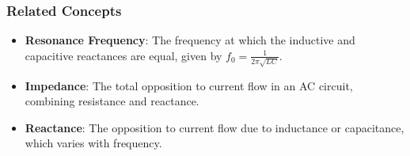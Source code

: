 \subsubsection{Related Concepts}
\begin{itemize}
    \item \textbf{Resonance Frequency}: The frequency at which the inductive and capacitive reactances are equal, given by \( f_0 = \frac{1}{2\pi\sqrt{LC}} \).
    \item \textbf{Impedance}: The total opposition to current flow in an AC circuit, combining resistance and reactance.
    \item \textbf{Reactance}: The opposition to current flow due to inductance or capacitance, which varies with frequency.
\end{itemize}


